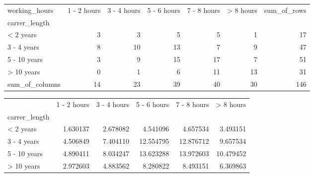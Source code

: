 \begin{tabular}{lrrrrrr}
\toprule
working\_hours &  1 - 2 hours &  3 - 4 hours &  5 - 6 hours &  7 - 8 hours &  > 8 hours &  sum\_of\_rows \\
carrer\_length  &              &              &              &              &            &              \\
\midrule
< 2 years      &            3 &            3 &            5 &            5 &          1 &           17 \\
3 - 4 years    &            8 &           10 &           13 &            7 &          9 &           47 \\
5 - 10 years   &            3 &            9 &           15 &           17 &          7 &           51 \\
> 10 years     &            0 &            1 &            6 &           11 &         13 &           31 \\
sum\_of\_columns &           14 &           23 &           39 &           40 &         30 &          146 \\
\bottomrule
\end{tabular}
\begin{tabular}{lrrrrr}
\toprule
{} &  1 - 2 hours &  3 - 4 hours &  5 - 6 hours &  7 - 8 hours &  > 8 hours \\
carrer\_length &              &              &              &              &            \\
\midrule
< 2 years     &     1.630137 &     2.678082 &     4.541096 &     4.657534 &   3.493151 \\
3 - 4 years   &     4.506849 &     7.404110 &    12.554795 &    12.876712 &   9.657534 \\
5 - 10 years  &     4.890411 &     8.034247 &    13.623288 &    13.972603 &  10.479452 \\
> 10 years    &     2.972603 &     4.883562 &     8.280822 &     8.493151 &   6.369863 \\
\bottomrule
\end{tabular}
